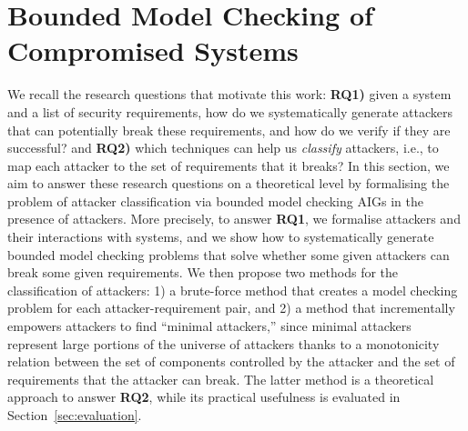 {%
\section{Bounded Model Checking of Compromised Systems}
\label{sec:bmc}
We recall the research questions that motivate this work: \textbf{RQ1)} given a system and a list of security requirements, how do we systematically generate attackers that can potentially break these requirements, and how do we verify if they are successful? and \textbf{RQ2)} which techniques can help us \emph{classify} attackers, i.e., to map each attacker to the set of requirements that it breaks? 
In this section, we aim to answer these research questions on a theoretical level by formalising the problem of attacker classification via bounded model checking AIGs in the presence of attackers. More precisely, to answer \textbf{RQ1}, we formalise attackers and their interactions with systems, and we show how to systematically generate bounded model checking problems that solve whether some given attackers can break some given requirements. We then propose two methods for the classification of attackers: 1) a brute-force method that creates a model checking problem for each attacker-requirement pair, and 2) a method that incrementally empowers attackers to find ``minimal attackers,'' since minimal attackers represent large portions of the universe of attackers thanks to a monotonicity relation between the set of components controlled by the attacker and the set of requirements that the attacker can break. The latter method is a theoretical approach to answer \textbf{RQ2}, while its practical usefulness is evaluated in Section~\ref{sec:evaluation}.

}
